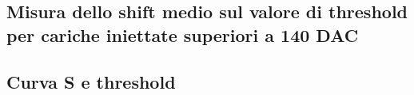 \documentclass[10pt,a4paper,twoside]{report}
\begin{document}
\subsection{Misura dello shift medio sul valore di threshold per cariche iniettate superiori a 140 DAC}

\begin{comment}
Per poter valutare dunque questo shift artificiale sul valore della threshold, per ogni flavor della matrice abbiamo effettuato due misure della threshold e sua dispersione separate:

\begin{itemize}
\item per carica iniettata pari a 140 DAC $\rightarrow$ prima della regione di saturazione;
\item per carica iniettata pari a 200 DAC $\rightarrow$ limite massimo della ragione di saturazione (da questo valore in poi, aumenta solo la threshold, non la carica effettivamente iniettata).
\end{itemize}

Per ognuna di queste misure, è stata fittata la distribuzione della threshold per poter ottenere un valore medio sull'intero flavor, e chiamando $\Q_{th, 140}$ e $\Q_{th, 200}$  rispettivamente i valori di threshold ottenuti per iniezione a 140 e 200 DAC, è stato stimato lo shift medio come:

\begin{equation}
\Delta Q = Q_{th,200} - Q_{th,140}
\end{equation}

Infine, ai dati ottenuti per impulsi di iniezioni di 200 DAC, è stato sottratto questo valore di carica, per poter estrapolare fino a un valore di 170 DAC effettivo, il comportamento dei pixel iniettati.

Si riporta nelle sezioni successive quanto ottenuto per ciascun flavor della matrice, con il metodo utilizzato per poter stimare la threshold.

\end{comment}

\subsection{Curva S e threshold}
\end{document}
